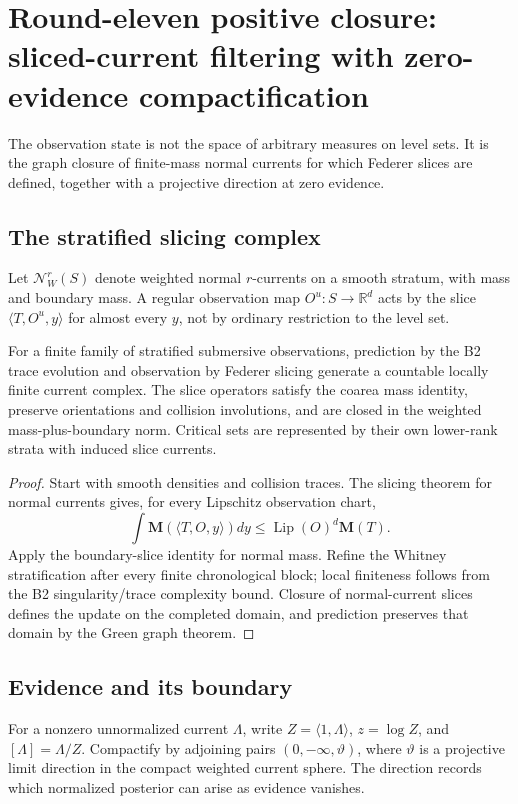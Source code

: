 \section{Round-eleven positive closure: sliced-current filtering with zero-evidence compactification}
\label{sec:r11-c1}

The observation state is not the space of arbitrary measures on level sets.
It is the graph closure of finite-mass normal currents for which Federer slices
are defined, together with a projective direction at zero evidence.

\subsection{The stratified slicing complex}
Let $\mathcal N_W^r(S)$ denote weighted normal $r$-currents on a smooth
stratum, with mass and boundary mass.  A regular observation map
$O^u:S\to\mathbb R^d$ acts by the slice
$\langle T,O^u,y\rangle$ for almost every $y$, not by ordinary restriction
to the level set.

\begin{theorem}
\label{thm:r11-c1-slice}
For a finite family of stratified submersive observations, prediction by the
B2 trace evolution and observation by Federer slicing generate a countable
locally finite current complex.  The slice operators satisfy the coarea mass
identity, preserve orientations and collision involutions, and are closed in
the weighted mass-plus-boundary norm.  Critical sets are represented by their
own lower-rank strata with induced slice currents.
\end{theorem}

\begin{proof}
Start with smooth densities and collision traces.  The slicing theorem for
normal currents gives, for every Lipschitz observation chart,
\[
 \int \mathbf M(\langle T,O,y\rangle)dy
 \le \operatorname{Lip}(O)^d\mathbf M(T).
\]
Apply the boundary-slice identity for normal mass.  Refine the Whitney
stratification after every finite chronological block; local finiteness follows
from the B2 singularity/trace complexity bound.  Closure of normal-current
slices defines the update on the completed domain, and prediction preserves
that domain by the Green graph theorem.
\end{proof}

\subsection{Evidence and its boundary}
For a nonzero unnormalized current $\Lambda$, write
$Z=\langle1,\Lambda\rangle$, $z=\log Z$, and
$[\Lambda]=\Lambda/Z$.  Compactify by adjoining pairs
$(0,-\infty,\vartheta)$, where $\vartheta$ is a projective limit direction
in the compact weighted current sphere.  The direction records which
normalized posterior can arise as evidence vanishes.

